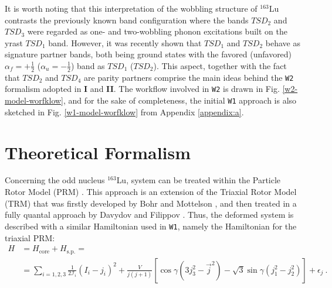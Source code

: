 \documentclass[myclassdoc,debug]{rjparticle}
\begin{document}
It is worth noting that this interpretation of the wobbling structure of $^{163}$Lu contrasts the previously known band configuration \cite{jensen2004coexisting,tanabe2006algebraic,frauendorf2014transverse} where the bands $TSD_2$ and $TSD_3$ were regarded as one- and two-wobbling phonon excitations built on the yrast $TSD_1$ band. However, it was recently shown \cite{raduta2020towards,raduta2020approach,raduta2020new} that $TSD_1$ and $TSD_2$ behave as signature partner bands, both being ground states with the favored (unfavored) $\alpha_f=+\frac{1}{2}$ ($\alpha_u=-\frac{1}{2}$) band as $TSD_1$ ($TSD_2$). This aspect, together with the fact that $TSD_2$ and $TSD_4$ are parity partners comprise the main ideas behind the \texttt{W2} formalism adopted in \textbf{I} and \textbf{II}. The workflow involved in \texttt{W2} is drawn in Fig. \ref{w2-model-worfklow}, and for the sake of completeness, the initial \texttt{W1} approach is also sketched in Fig. \ref{w1-model-worfklow} from Appendix \ref{appendix:a}.
\section{Theoretical Formalism}\label{section-theory}
Concerning the odd nucleus $^{163}$Lu, system can be treated within the Particle Rotor Model (PRM) \cite{hamamoto2002wobbling,hagemann2003quantized,frauendorf2014transverse}. This approach is an extension of the Triaxial Rotor Model (TRM) that was firstly developed by Bohr and Mottelson \cite{bohr1998nuclear}, and then treated in a fully quantal approach by Davydov and Filippov \cite{davydov1958rotational}. Thus, the deformed system is described with a similar Hamiltonian used in \texttt{W1}, namely the Hamiltonian for the triaxial PRM:
\begin{align}
    H&=H_\text{core}+H_\text{s.p.}=\nonumber\\
    &=\sum_{i=1,2,3}\frac{1}{2\mathcal{I}_i}(I_i-j_i)^2+\frac{V}{j(j+1)}\left[\cos\gamma(3j_3^2-\vec{j}^2)-\sqrt{3}\sin\gamma(j_1^2-j_2^2)\right]+\epsilon_j\ .
    \label{prm-hamiltonian}
\end{align}
\end{document}
